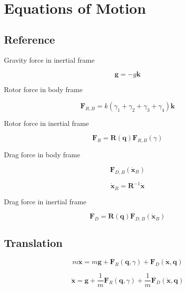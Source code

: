 \documentclass{article}
\begin{document}
\renewcommand{\nomgroup}[1]{%
	\ifthenelse{\equal{#1}{A}}{\item[\textbf{Variables}]}{%
	\ifthenelse{\equal{#1}{B}}{\item[\textbf{Subscripts}]}{}}}




\printnomenclature

\section{Equations of Motion}

\subsection{Reference}

Gravity force in inertial frame

\[
\mathbf{g} = -g \mathbf{k}
\]

Rotor force in body frame

\[
\mathbf{F}_{R,B} = k \left( \gamma_1 + \gamma_2 + \gamma_3 + \gamma_4 \right) \mathbf{k}
\]

Rotor force in inertial frame

\[
\mathbf{F}_R = \mathbf{R}(\mathbf{q}) \mathbf{F}_{R,B}(\gamma)
\]

Drag force in body frame

\[
\mathbf{F}_{D,B}(\dot{\mathbf{x}}_B)
\]

\[
\dot{\mathbf{x}}_B = \mathbf{R}^{-1} \dot{\mathbf{x}}
\]

Drag force in inertial frame

\[
\mathbf{F}_D =  \mathbf{R}(\mathbf{q}) \mathbf{F}_{D,B}(\dot{\mathbf{x}}_B)
\]


\subsection{Translation}

\[
m \ddot{\mathbf{x}} = m \mathbf{g} + \mathbf{F}_R(\mathbf{q},\gamma) + \mathbf{F}_D(\dot{\mathbf{x}},\mathbf{q})
\]

\[
\ddot{\mathbf{x}} = \mathbf{g} + \frac{1}{m} \mathbf{F}_R(\mathbf{q},\gamma) + \frac{1}{m} \mathbf{F}_D(\dot{\mathbf{x}},\mathbf{q})
\]
\end{document}
